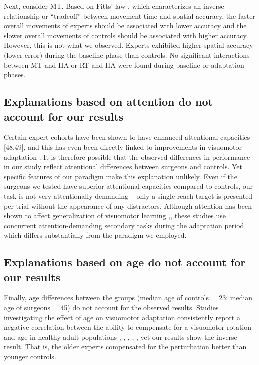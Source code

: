 \documentclass[jou, 11pt, longtable, floatsintext, notab]{apa6}
\begin{document}
Next, consider MT. Based on Fitts’ law
\cite{bavelier_enhancing_2019}, which characterizes an
inverse relationship or “tradeoff” between movement time and
spatial accuracy, the faster overall movements of experts
should be associated with lower accuracy and the slower
overall movements of controls should be associated with
higher accuracy. However, this is not what we observed.
Experts exhibited higher spatial accuracy (lower error)
during the baseline phase than controls. No significant
interactions between MT and HA or RT and HA were found
during baseline or adaptation phases.

\subsection{Explanations based on attention do not account 
for our results}
Certain expert cohorts have been shown to have enhanced
attentional capacities [48,49], and this has even been
directly linked to improvements in visuomotor adaptation
\cite{debats_explicit_2018}. It is therefore possible that
the observed differences in performance in our study reflect
attentional differences between surgeons and controls. Yet
specific features of our paradigm make this explanation
unlikely. Even if the surgeons we tested have superior
attentional capacities compared to controls, our task is not
very attentionally demanding – only a single reach target is
presented per trial without the appearance of any
distractors. Although attention has been shown to affect
generalization of visuomotor learning
\cite{bedard_attention_2013},\cite{wang_impaired_2017},
these studies use concurrent attention-demanding secondary
tasks during the adaptation period which differs
substantially from the paradigm we employed.

\subsection{Explanations based on age do not account 
    for our results}
Finally, age differences between the groups (median age of
controls = 23; median age of surgeons = 45) do not account
for the observed results. Studies investigating the effect
of age on visuomotor adaptation consistently report a
negative correlation between the ability to compensate for a
visuomotor rotation and age in healthy adult populations
\cite{anguera_failure_2011},
\cite{seidler_differential_2006},
\cite{voelcker-rehage_motor-skill_2008},
\cite{king_neural_2013}, \cite{buch_visuomotor_2003}, yet
our results show the inverse result. That is, the older
experts compensated for the perturbation better than younger
controls.
\end{document}
